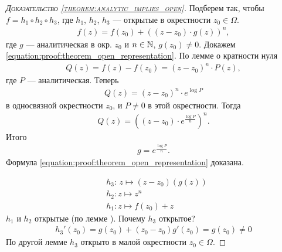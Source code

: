 \documentclass[../../main.tex]{subfiles}
\begin{document}
\begin{proof}[\normalfont\textsc{Доказательство \eqref{theorem:analytic_implies_open}}]
  Подберем так, чтобы $ f = h_1 \circ h_2 \circ h_3 $, где $ h_1 $, $ h_2 $, $ h_3 $ --- открытые в окрестности $ z_0 \in \Omega $.
 \begin{align}
  \label{equation:proof:theorem_open_representation}
  f(z) = f(z_0) + \left((z - z_0) \cdot g(z) \right)^{n},
 \end{align} где $ g $ --- аналитическая в окр. $ z_0 $ и $ n \in \mathbb{N} $, $ g(z_0) \neq 0 $. Докажем \eqref{equation:proof:theorem_open_representation}. По лемме о кратности нуля
 \begin{align*}
  Q(z) = f(z) - f(z_0) = (z - z_0)^{n} \cdot P(z),
 \end{align*} где $ P $ --- аналитическая. Теперь
 \begin{align*}
  Q(z) = (z - z_0)^{n} \cdot e^{\log P}
 \end{align*} в односвязной окрестности $ z_0 $, и $ P \neq 0 $ в этой окрестности. Тогда
 \begin{align*}
  Q(z) = \left((z-z_0) \cdot e^{\frac{\log P}{n}}\right)^{n}.
 \end{align*} Итого
 \begin{align*}
  g = e^{\frac{\log P}{n}}.
 \end{align*} Формула \eqref{equation:proof:theorem_open_representation} доказана.

 \begin{align*}
  &h_3 \colon\, z \mapsto (z-z_0)(g(z)) \\
  &h_2 \colon z \mapsto z^{n} \\
  &h_1 \colon z \mapsto f(z_0) + z
 \end{align*} $ h_1 $ и $ h_2 $ открытые (по лемме ). Почему $ h_3 $ открытое?
 \begin{align*}
  h_3'(z_0) = g(z_0) + (z_0 - z_0) g'(z_0) = g(z_0) \neq 0
 \end{align*} По другой лемме $ h_3 $ открыто в малой окрестности $ z_0 \in \Omega $.

\end{proof}
\end{document}
